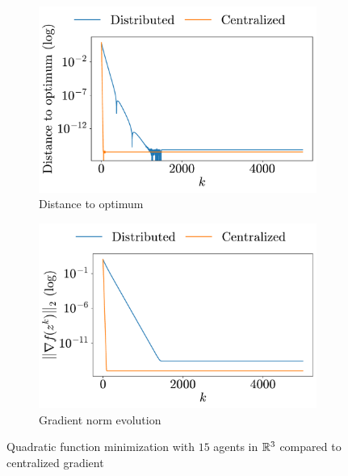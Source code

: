 \documentclass[a4paper,11pt,oneside]{book}
\begin{document}
\begin{figure}[h!]
      \centering
      \begin{subfigure}[h]{0.43\linewidth}
            \centering
            \includegraphics[width=\linewidth]{./figs/quadratic/centralized/distance.pdf} 
            \caption{Distance to optimum}
      \end{subfigure}
      \hfill
      \begin{subfigure}[h]{0.43\linewidth}
            \centering
            \includegraphics[width=\linewidth]{./figs/quadratic/centralized/gradient.pdf} 
            \caption{Gradient norm evolution}
      \end{subfigure}
      \caption{Quadratic function minimization with $15$ agents in ${\mathbb{R}}^{3}$ compared to centralized gradient}
      \label{fig:quadratic_centralized_15_3}
\end{figure}
\end{document}
